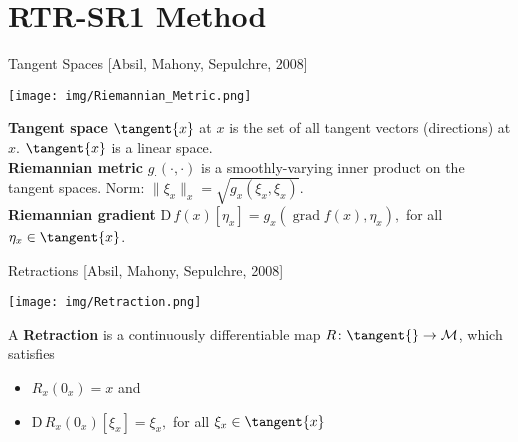 \documentclass{beamer}
\begin{document}
\section{RTR-SR1 Method}

\begin{frame}{Tangent Spaces}
    \vspace{-1\baselineskip}\hfill{\tiny{[Absil, Mahony, Sepulchre, 2008]}}
    \begin{center}
        \texttt{[image: img/Riemannian\_Metric.png]}
    \end{center}
    \textbf{Tangent space} $\tangent{x}$ at $x$ is the set of all tangent vectors (directions) at $x$. $\tangent{x}$ is a linear space. \\[0.2\baselineskip]
    \textbf{Riemannian metric} $g_{\cdot} (\cdot, \cdot)$ is a smoothly-varying inner product on the tangent spaces. Norm: $\lVert \xi_x \rVert_x = \sqrt{g_x(\xi_x, \xi_x)}$. \\[0.2\baselineskip]
    \textbf{Riemannian gradient} $\mathrm{D} \, f(x) [\eta_x] = g_x (\operatorname{grad} f(x), \eta_x),$ for all $\eta_x \in \tangent{x}$.
\end{frame}

\begin{frame}{Retractions}
    \vspace{-1\baselineskip}\hfill{\tiny{[Absil, Mahony, Sepulchre, 2008]}}
    \begin{center}
        \texttt{[image: img/Retraction.png]}
    \end{center}
    A \textbf{Retraction} is a continuously differentiable map $R \colon \tangent{} \to \mathcal{M}$, which satisfies \\[-0.1\baselineskip]
    \begin{itemize}
        \item $R_x (0_x) = x$ and
        \item $\mathrm{D} \, R_x (0_x)[\xi_x] = \xi_x,$ for all $\xi_x \in \tangent{x}$
    \end{itemize}
\end{frame}
\end{document}
